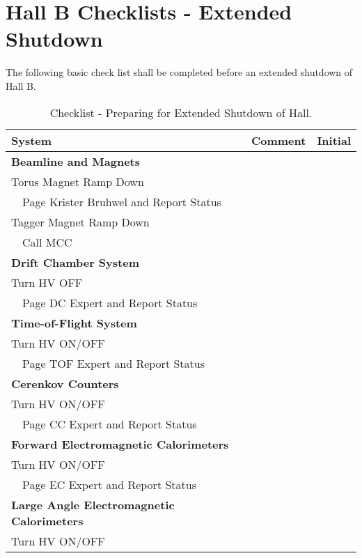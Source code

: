 \begin{table}[p]
\section{Hall B Checklists - Extended Shutdown}
The following basic check list shall be completed before an extended 
shutdown of Hall B. 
\caption{\label{table:shutdown}Checklist - Preparing for Extended 
Shutdown of Hall.} 
\begin{center}
\begin{tabular}{|l|c|c|} \hline 
  System & \hspace{1.0cm}Comment\hspace{1.0cm} &  Initial  \\ \hline
\bf{Beamline and Magnets}                     & & \\		
Torus Magnet Ramp Down                        & & \\
~~Page Krister Bruhwel and Report Status      & & \\
Tagger Magnet Ramp Down                       & & \\
~~Call MCC                                    & & \\ \hline
\bf{Drift Chamber System}                     & & \\
Turn HV OFF                                   & & \\
~~Page DC Expert and Report Status            & & \\ \hline
\bf{Time-of-Flight System}                    & & \\			
Turn HV ON/OFF                                & & \\
~~Page TOF Expert and Report Status           & & \\ \hline
\bf{Cerenkov Counters}                        & & \\		
Turn HV ON/OFF                                & & \\
~~Page CC Expert and Report Status            & & \\ \hline
\bf{Forward Electromagnetic Calorimeters}     & & \\
Turn HV ON/OFF                                & & \\
~~Page EC Expert and Report Status            & & \\ \hline
\bf{Large Angle Electromagnetic Calorimeters} & & \\
Turn HV ON/OFF                                & & \\

\end{tabular}
\end{center}
\end{table}
